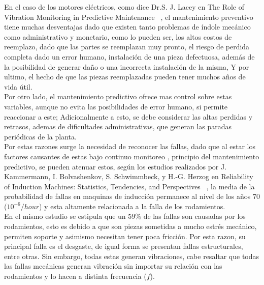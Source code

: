 	En el caso de los motores eléctricos, como dice Dr.S. J. Lacey en The Role of Vibration Monitoring in Predictive Maintenance ~\cite{Lacey}, el mantenimiento preventivo tiene muchas desventajas dado que existen tanto problemas de índole mecánico como administrativo y monetario, como lo pueden ser, los altos costos de reemplazo, dado que las partes se reemplazan muy pronto, el riesgo de perdida completa dado un error humano, instalación de una pieza defectuosa, además de la posibilidad de generar daño o una incorrecta instalación de la misma, Y por ultimo, el hecho de que las piezas reemplazadas pueden tener muchos años de vida útil.\\
	
	Por otro lado, el mantenimiento predictivo ofrece mas control sobre estas variables, aunque no evita las posibilidades de error humano, si permite reaccionar a este; Adicionalmente a esto, se debe considerar las altas perdidas y retrasos, ademas de dificultades administrativas, que generan las paradas periódicas de la planta.\\

	Por estas razones surge la necesidad de reconocer las fallas, dado que al estar los factores causantes de estas bajo continuo monitoreo , principio del mantenimiento predictivo, se pueden atenuar estos, según los estudios realizados por J. Kammermann, I. Bolvashenkov, S. Schwimmbeck, y H.-G. Herzog en Reliability of Induction Machines: Statistics, Tendencies, and Perspectives ~\cite{Kammermann}, la media de la probabilidad de fallas en maquinas de inducción permanece al nivel de los años 70 ($10^{-6}/hour$) y esta altamente relacionada a la falla de los rodamientos.\\

	En el mismo estudio se estipula que un 59\% de las fallas son causadas por los rodamientos, esto es debido a que son piezas sometidas a mucho estrés mecánico, permiten soporte y asimismo necesitan tener poca fricción. Por esta razon, su principal falla es el desgaste, de igual forma se presentan fallas estructurales, entre otras. Sin embargo, todas estas generan vibraciones, cabe resaltar que todas las fallas mecánicas generan vibración sin importar su relación con las rodamientos y lo hacen a distinta frecuencia ($f$). \\


